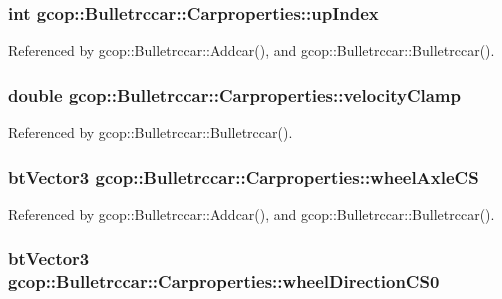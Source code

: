 \subsubsection[{up\-Index}]{\setlength{\rightskip}{0pt plus 5cm}int {\bf gcop\-::\-Bulletrccar\-::\-Carproperties\-::up\-Index}}\label{structgcop_1_1Bulletrccar_1_1Carproperties_a95a25ecfc8324db3fe885cbd868a4692}


\-Referenced by gcop\-::\-Bulletrccar\-::\-Addcar(), and gcop\-::\-Bulletrccar\-::\-Bulletrccar().

\subsubsection[{velocity\-Clamp}]{\setlength{\rightskip}{0pt plus 5cm}double {\bf gcop\-::\-Bulletrccar\-::\-Carproperties\-::velocity\-Clamp}}\label{structgcop_1_1Bulletrccar_1_1Carproperties_a85f6a10203212da922372c1d06937e48}


\-Referenced by gcop\-::\-Bulletrccar\-::\-Bulletrccar().

\subsubsection[{wheel\-Axle\-C\-S}]{\setlength{\rightskip}{0pt plus 5cm}bt\-Vector3 {\bf gcop\-::\-Bulletrccar\-::\-Carproperties\-::wheel\-Axle\-C\-S}}\label{structgcop_1_1Bulletrccar_1_1Carproperties_a3072e39787f377040cd9fc7b728adca5}


\-Referenced by gcop\-::\-Bulletrccar\-::\-Addcar(), and gcop\-::\-Bulletrccar\-::\-Bulletrccar().

\subsubsection[{wheel\-Direction\-C\-S0}]{\setlength{\rightskip}{0pt plus 5cm}bt\-Vector3 {\bf gcop\-::\-Bulletrccar\-::\-Carproperties\-::wheel\-Direction\-C\-S0}}\label{structgcop_1_1Bulletrccar_1_1Carproperties_aee83a737aaa604e01cb55229d28432f6}



